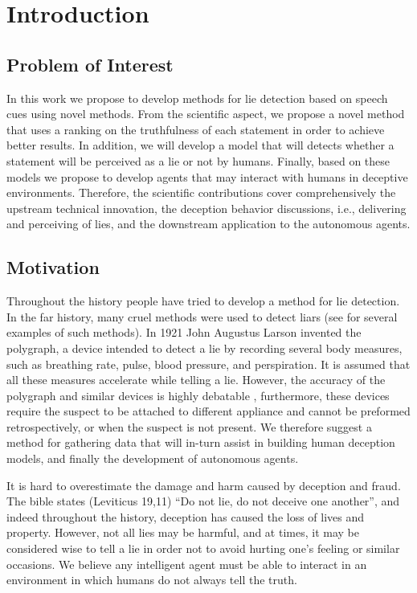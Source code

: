 \chapter{Introduction} %
\label{Chapter1}
\section {Problem of Interest}

In this work we propose to develop methods for lie detection based on speech cues using novel methods. From the scientific aspect, we propose a novel method that uses a ranking on the truthfulness of each statement in order to achieve better results.
In addition, we will develop a model that will detects whether a statement will be perceived as a lie or not by humans.
Finally, based on these models we propose to develop agents that may interact with humans in deceptive environments. Therefore, the scientific contributions cover comprehensively the upstream technical innovation, the deception behavior discussions, i.e., delivering and perceiving of lies, and the downstream application to the autonomous agents.

\section {Motivation}

Throughout the history people have tried to develop a method for lie detection. In the far history, many cruel methods were used to detect liars (see \cite{trovillo1938history} for several examples of such methods). In 1921 John Augustus Larson invented the polygraph, a device intended to detect a lie by recording several body measures, such as breathing rate, pulse, blood pressure, and perspiration. It is assumed that all these measures accelerate while telling a lie.
However, the accuracy of the polygraph and similar devices is highly debatable \cite{patrick1989psychopathy,ekman2003unmasking,grubin2006accuracy}, furthermore, these devices require the suspect to be attached to different appliance and cannot be preformed retrospectively, or when the suspect is not present.
We therefore suggest a method for gathering data that will in-turn assist in building human deception models, and finally the development of autonomous agents.

It is hard to overestimate the damage and harm caused by deception and fraud. The bible states (Leviticus 19,11) ``Do not lie, do not deceive one another'', and indeed throughout the history, deception has caused the loss of lives and property. However, not all lies may be harmful, and at times, it may be considered wise to tell a lie in order not to avoid hurting one's feeling or similar occasions. We believe any intelligent agent must be able to interact in an environment in which humans do not always tell the truth.

